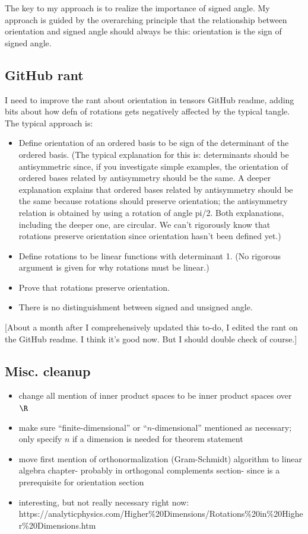 The key to my approach is to realize the importance of signed angle. My approach is guided by the overarching principle that the relationship between orientation and signed angle should always be this: orientation is the sign of signed angle.

\subsection*{GitHub rant}

I need to improve the rant about orientation in tensors GitHub readme, adding bits about how defn of rotations gets negatively affected by the typical tangle. The typical approach is:

\begin{itemize}
	\item Define orientation of an ordered basis to be sign of the determinant of the ordered basis. (The typical explanation for this is: determinants should be antisymmetric since, if you investigate simple examples, the orientation of ordered bases related by antisymmetry should be the same. A deeper explanation explains that ordered bases related by antisymmetry should be the same because rotations should preserve orientation; the antisymmetry relation is obtained by using a rotation of angle pi/2. Both explanations, including the deeper one, are circular. We can't rigorously know that rotations preserve orientation since orientation hasn’t been defined yet.)
	\item Define rotations to be linear functions with determinant 1. (No rigorous argument is given for why rotations must be linear.)
	\item Prove that rotations preserve orientation.
	\item There is no distinguishment between signed and unsigned angle.
\end{itemize}

[About a month after I comprehensively updated this to-do, I edited the rant on the GitHub readme. I think it's good now. But I should double check of course.]

\subsection*{Misc. cleanup}

\begin{itemize}
	\item change all mention of inner product spaces to be inner product spaces over $\R$
	\item make sure ``finite-dimensional'' or ``$n$-dimensional'' mentioned as necessary; only specify $n$ if a dimension is needed for theorem statement
	\item move first mention of orthonormalization (Gram-Schmidt) algorithm to linear algebra chapter- probably in orthogonal complements section- since is a prerequisite for orientation section
	\item interesting, but not really necessary right now: https://analyticphysics.com/Higher\%20Dimensions/Rotations\%20in\%20Higher\%20Dimensions.htm
\end{itemize}

